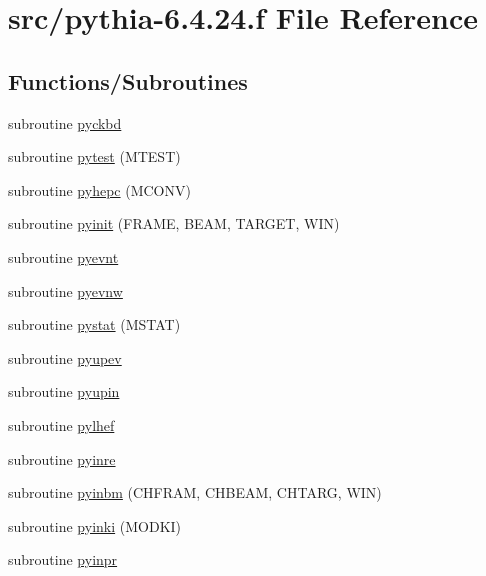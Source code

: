 \hypertarget{pythia-6_84_824_8f}{}\section{src/pythia-\/6.4.24.f File Reference}
\label{pythia-6_84_824_8f}
\subsection*{Functions/\+Subroutines}
\begin{DoxyCompactItemize}
\item 
subroutine \hyperlink{pythia-6_84_824_8f_a6655a210e16c775882e736cb73e6fba1}{pyckbd}
\item 
subroutine \hyperlink{pythia-6_84_824_8f_a4cc0e611278607d6b413b5cecdfe16c3}{pytest} (M\+T\+E\+ST)
\item 
subroutine \hyperlink{pythia-6_84_824_8f_a75df891b8b5e5b18d29325afa1f5e632}{pyhepc} (M\+C\+O\+NV)
\item 
subroutine \hyperlink{pythia-6_84_824_8f_aac00ac3ccd923c2c3dc37e2b89a9f025}{pyinit} (F\+R\+A\+ME, B\+E\+AM, T\+A\+R\+G\+ET, W\+IN)
\item 
subroutine \hyperlink{pythia-6_84_824_8f_ac81fa418f8cd77b0873b2de2a4140933}{pyevnt}
\item 
subroutine \hyperlink{pythia-6_84_824_8f_a83ae6561ab82fd7af8b1b3e511f477ac}{pyevnw}
\item 
subroutine \hyperlink{pythia-6_84_824_8f_a6776838d34f1f049686d19132f43a249}{pystat} (M\+S\+T\+AT)
\item 
subroutine \hyperlink{pythia-6_84_824_8f_ae7cb37215e5a38b3fb0529c9996646e6}{pyupev}
\item 
subroutine \hyperlink{pythia-6_84_824_8f_a710b769b07c1b2a27ba2ef3108e84bed}{pyupin}
\item 
subroutine \hyperlink{pythia-6_84_824_8f_a2a33a24facc5f203a1b7ecccd4374c93}{pylhef}
\item 
subroutine \hyperlink{pythia-6_84_824_8f_a6fa4e6a261de929c41d509ff9aadde33}{pyinre}
\item 
subroutine \hyperlink{pythia-6_84_824_8f_af14ac174afbf502859c3196479097c50}{pyinbm} (C\+H\+F\+R\+AM, C\+H\+B\+E\+AM, C\+H\+T\+A\+RG, W\+IN)
\item 
subroutine \hyperlink{pythia-6_84_824_8f_ae42caa9ba7af0a1b008fa608c8941e43}{pyinki} (M\+O\+D\+KI)
\item 
subroutine \hyperlink{pythia-6_84_824_8f_a29c8fd890d3cef2da967153af66836ba}{pyinpr}
\item 

\end{DoxyCompactItemize}
